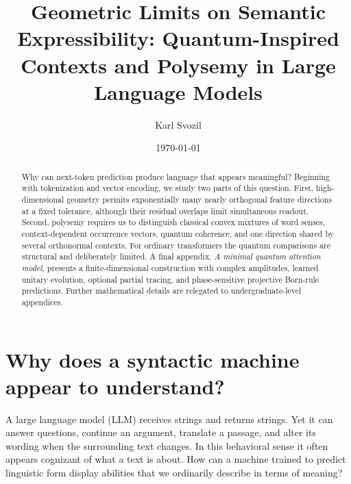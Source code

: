 \documentclass[
  aps,
  reprint,
  superscriptaddress,
  floatfix,
  nofootinbib,
  longbibliography
]{revtex4-2}
\begin{document}
\title{Geometric Limits on Semantic Expressibility: Quantum-Inspired Contexts and Polysemy in Large Language Models}

\author{Karl Svozil}

\date{\today}

\begin{abstract}
Why can next-token prediction produce language that appears meaningful?
Beginning with tokenization and vector encoding, we study two parts of this
question.  First, high-dimensional geometry permits exponentially many nearly
orthogonal feature directions at a fixed tolerance, although their residual
overlaps limit simultaneous readout.  Second, polysemy requires us to
distinguish classical convex mixtures of word senses, context-dependent
occurrence vectors, quantum coherence, and one direction shared by several
orthonormal contexts.  For ordinary transformers the quantum comparisons are
structural and deliberately limited.  A final appendix, \emph{A minimal
quantum attention model}, presents a finite-dimensional construction with
complex amplitudes, learned unitary evolution, optional partial tracing, and
phase-sensitive projective Born-rule predictions.
Further mathematical details are
relegated to undergraduate-level appendices.
\end{abstract}

\maketitle

\section{Why does a syntactic machine appear to understand?}
\label{sec:puzzle}

A large language model (LLM) receives strings and returns strings.  Yet it can
answer questions, continue an argument, translate a passage, and alter its
wording when the surrounding text changes.  In this behavioral sense it often
appears cognizant of what a text is about.  How can a machine trained to
predict linguistic form display abilities that we ordinarily describe in
terms of meaning?
\end{document}
